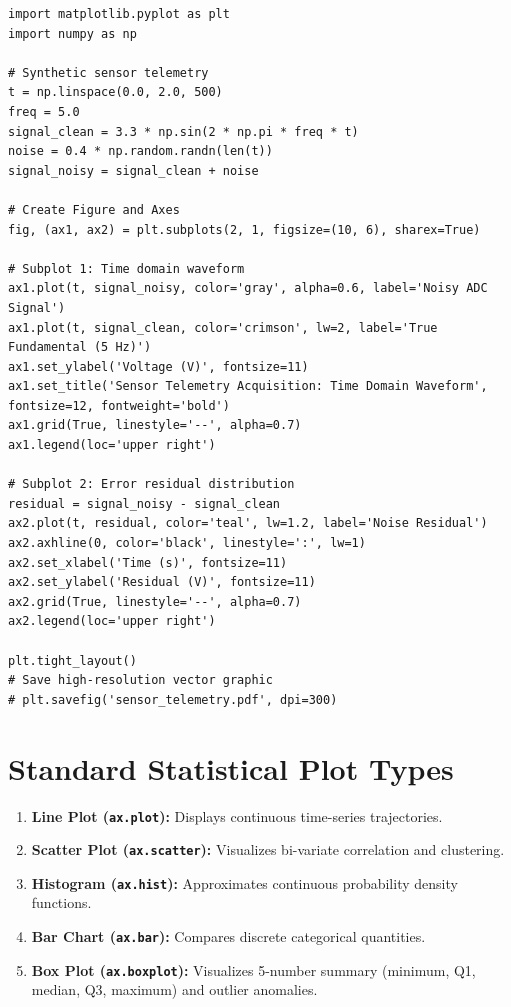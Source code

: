 \begin{lstlisting}[caption={Engineering Signal Visualization using the OO API}]
import matplotlib.pyplot as plt
import numpy as np

# Synthetic sensor telemetry
t = np.linspace(0.0, 2.0, 500)
freq = 5.0
signal_clean = 3.3 * np.sin(2 * np.pi * freq * t)
noise = 0.4 * np.random.randn(len(t))
signal_noisy = signal_clean + noise

# Create Figure and Axes
fig, (ax1, ax2) = plt.subplots(2, 1, figsize=(10, 6), sharex=True)

# Subplot 1: Time domain waveform
ax1.plot(t, signal_noisy, color='gray', alpha=0.6, label='Noisy ADC Signal')
ax1.plot(t, signal_clean, color='crimson', lw=2, label='True Fundamental (5 Hz)')
ax1.set_ylabel('Voltage (V)', fontsize=11)
ax1.set_title('Sensor Telemetry Acquisition: Time Domain Waveform', fontsize=12, fontweight='bold')
ax1.grid(True, linestyle='--', alpha=0.7)
ax1.legend(loc='upper right')

# Subplot 2: Error residual distribution
residual = signal_noisy - signal_clean
ax2.plot(t, residual, color='teal', lw=1.2, label='Noise Residual')
ax2.axhline(0, color='black', linestyle=':', lw=1)
ax2.set_xlabel('Time (s)', fontsize=11)
ax2.set_ylabel('Residual (V)', fontsize=11)
ax2.grid(True, linestyle='--', alpha=0.7)
ax2.legend(loc='upper right')

plt.tight_layout()
# Save high-resolution vector graphic
# plt.savefig('sensor_telemetry.pdf', dpi=300)
\end{lstlisting}

\section{Standard Statistical Plot Types}
\begin{enumerate}[leftmargin=1.8em, itemsep=3pt]
    \item \textbf{Line Plot (\texttt{ax.plot}):} Displays continuous time-series trajectories.
    \item \textbf{Scatter Plot (\texttt{ax.scatter}):} Visualizes bi-variate correlation and clustering.
    \item \textbf{Histogram (\texttt{ax.hist}):} Approximates continuous probability density functions.
    \item \textbf{Bar Chart (\texttt{ax.bar}):} Compares discrete categorical quantities.
    \item \textbf{Box Plot (\texttt{ax.boxplot}):} Visualizes 5-number summary (minimum, Q1, median, Q3, maximum) and outlier anomalies.
\end{enumerate}

